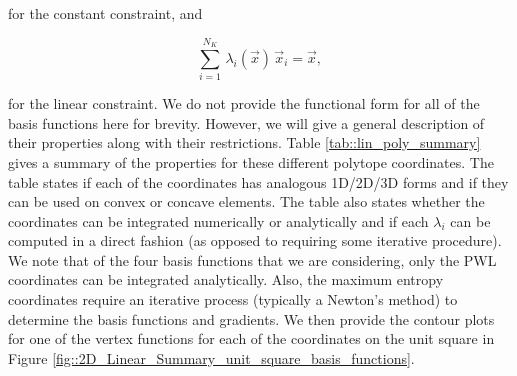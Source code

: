 \documentclass[11pt]{article}
\begin{document}
\noindent for the constant constraint, and 

\begin{equation}
\label{eq::Lin_linear_constraint}
\sum_{i=1}^{N_K} \,  \lambda_i(\vec{x}) \, \vec{x}_i  =\vec{x} ,
\end{equation}

\noindent for the linear constraint. We do not provide the functional form for all of the basis functions here for brevity. However, we will give a general description of their properties along with their restrictions. Table \ref{tab::lin_poly_summary} gives a summary of the properties for these different polytope coordinates. The table states if each of the coordinates has analogous 1D/2D/3D forms and if they can be used on convex or concave elements. The table also states whether the coordinates can be integrated numerically or analytically and if each $\lambda_i$ can be computed in a direct fashion (as opposed to requiring some iterative procedure). We note that of the four basis functions that we are considering, only the PWL coordinates can be integrated analytically. Also, the maximum entropy coordinates require an iterative process (typically a Newton's method) to determine the basis functions and gradients. We then provide the contour plots for one of the vertex functions for each of the coordinates on the unit square in Figure \ref{fig::2D_Linear_Summary_unit_square_basis_functions}.
\end{document}
